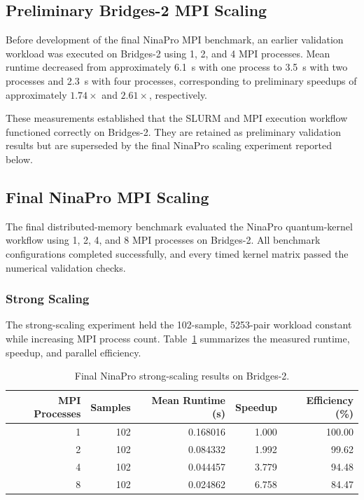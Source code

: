 \documentclass[pdflatex,sn-mathphys-num]{sn-jnl}%
\theoremstyle{thmstyleone}%
\theoremstyle{thmstyletwo}%
\theoremstyle{thmstylethree}%
\begin{document}
\subsection{Preliminary Bridges-2 MPI Scaling}
\label{subsec:preliminary-mpi-results}

Before development of the final NinaPro MPI benchmark, an earlier validation
workload was executed on Bridges-2 using 1, 2, and 4 MPI processes. Mean
runtime decreased from approximately 6.1~s with one process to 3.5~s with two
processes and 2.3~s with four processes, corresponding to preliminary speedups
of approximately \(1.74\times\) and \(2.61\times\), respectively.

These measurements established that the SLURM and MPI execution workflow
functioned correctly on Bridges-2. They are retained as preliminary validation
results but are superseded by the final NinaPro scaling experiment reported
below.


\subsection{Final NinaPro MPI Scaling}
\label{subsec:final-mpi-results}

The final distributed-memory benchmark evaluated the NinaPro quantum-kernel
workflow using 1, 2, 4, and 8 MPI processes on Bridges-2. All benchmark
configurations completed successfully, and every timed kernel matrix passed
the numerical validation checks.


\subsubsection{Strong Scaling}

The strong-scaling experiment held the 102-sample, 5253-pair workload constant
while increasing MPI process count. Table~\ref{tab:strong-scaling-results}
summarizes the measured runtime, speedup, and parallel efficiency.

\begin{table}[!htbp]
\centering
\caption{Final NinaPro strong-scaling results on Bridges-2.}
\label{tab:strong-scaling-results}
\begin{tabular}{rrrrr}
\toprule
MPI Processes &
Samples &
Mean Runtime (s) &
Speedup &
Efficiency (\%) \\
\midrule
1 & 102 & 0.168016 & 1.000 & 100.00 \\
2 & 102 & 0.084332 & 1.992 & 99.62 \\
4 & 102 & 0.044457 & 3.779 & 94.48 \\
8 & 102 & 0.024862 & 6.758 & 84.47 \\
\bottomrule
\end{tabular}
\end{table}
\end{document}
